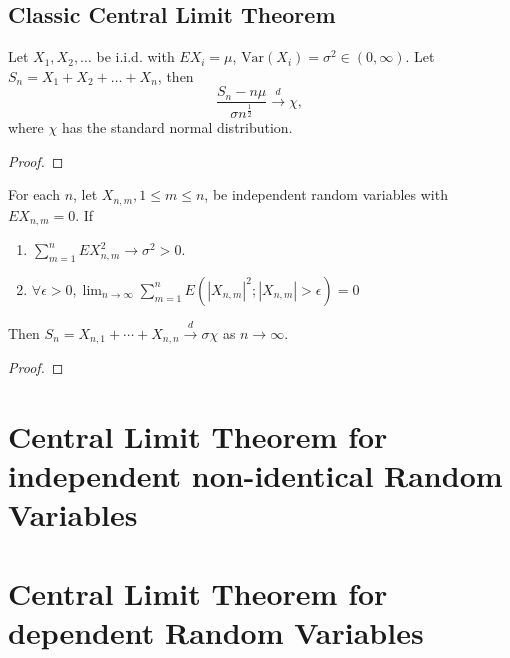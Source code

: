 \subsection{Classic Central Limit Theorem}

\begin{theorem}
    Let $X_1,X_2,\ldots$ be i.i.d. with $EX_i=\mu$, $\text{Var}(X_i)=\sigma^2\in(0,\infty)$. Let $S_n=X_1+X_2+\ldots+X_n$, then
    \begin{equation}
        \frac{S_n-n\mu}{\sigma n^{\frac{1}{2}}} \stackrel{d}{\rightarrow} \chi,
    \end{equation}
    where $\chi$ has the standard normal distribution.
\end{theorem}

\begin{proof}

\end{proof}

\begin{theorem}
    For each $n$, let $X_{n,m},1\leq m\leq n$, be independent random variables with $EX_{n,m}=0$. If
    \begin{enumerate}
        \item $\sum_{m=1}^{n}EX_{n,m}^{2} \rightarrow \sigma^{2}>0$.
        \item $\forall\epsilon>0,\lim_{n\rightarrow\infty}\sum_{m=1}^{n}E\left(\left|X_{n,m}\right|^{2};\left|X_{n,m}\right|>\epsilon\right)=0$
    \end{enumerate}
    Then $S_{n}=X_{n,1}+\cdots+X_{n,n}\stackrel{d}{\rightarrow}\sigma\chi$ as $n\rightarrow\infty$.
\end{theorem}

\begin{proof}

\end{proof}

\section{Central Limit Theorem for independent non-identical Random Variables}

\begin{theorem}
    
\end{theorem}

\section{Central Limit Theorem for dependent Random Variables}
